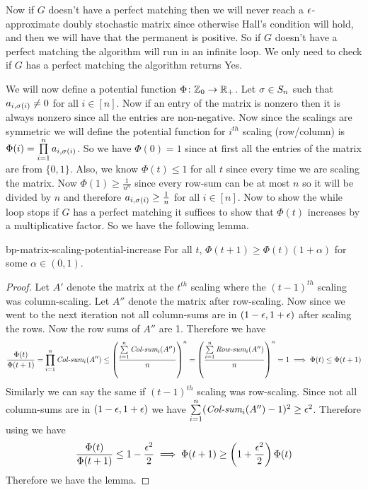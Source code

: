 Now if $G$ doesn't have a perfect matching then we will never reach a $\epsilon$-approximate doubly stochastic matrix since otherwise Hall's condition will hold, and then we will have that the permanent is positive. So if $G$ doesn't have a perfect matching the algorithm will run in an infinite loop. We only need to check if $G$ has a perfect matching the algorithm returns Yes.

We will now define a potential function $\Phi\colon \mathbb{Z}_0\to \mathbb{R}_+$. Let $\sigma\in S_n$ such that $a_{i,\sigma(i)}\neq 0$ for all $i\in[n]$. Now if an entry of the matrix is nonzero then it is always nonzero since all the entries are non-negative. Now since the scalings are symmetric we will define the potential function for $i^{th}$ scaling (row/column) is $\Phi(i)=\prod\limits_{i=1}^n a_{i,\sigma(i)}$. So we have $\Phi(0)=1$ since at first all the entries of the matrix are from $\{0,1\}$. Also, we know $\Phi(t)\leq 1$ for all $t$ since every time we are scaling the matrix. Now $\Phi(1)\geq \frac1{n^n}$ since every row-sum can be at most $n$ so it will be divided by $n$ and therefore $a_{i,\sigma(i)}\geq \frac1n$ for all $i\in[n]$. Now to show the while loop stops if $G$ has a perfect matching it suffices to show that $\Phi(t)$ increases by a multiplicative factor. So we have the following lemma.
\begin{lemma}{}{bp-matrix-scaling-potential-increase}
	For all $t$, 	$\Phi(t+1)\geq \Phi(t)(1+\alpha)$ for some $\alpha\in (0,1)$.
\end{lemma}
\begin{proof}
	Let $A'$ denote the matrix at the $t^{th}$ scaling where the $(t-1)^{th}$ scaling was column-scaling. Let $A''$ denote the matrix after row-scaling. Now since we went to the next iteration not all column-sums are in $(1-\epsilon, 1+\epsilon)$ after scaling the rows. Now the row sums of $A''$ are 1. Therefore we have $$\frac{\Phi(t)}{\Phi(t+1)}= \prod_{i=1}^n\emph{Col-sum}_i(A'')\leq \left(\frac{\sum\limits_{i=1}^n \emph{Col-sum}_i(A'')}n\right)^n=\left(\frac{\sum\limits_{i=1}^n \emph{Row-sum}_i(A'')}n\right)^n=1\implies \Phi(t)\leq \Phi(t+1)$$Similarly we can say the same if $(t-1)^{th}$ scaling was row-scaling. Since  not all column-sums are in $(1-\epsilon, 1+\epsilon)$ we have $\sum\limits_{i=1}^n(\emph{Col-sum}_i(A'')-1)^2\geq \epsilon^2$. Therefore using  we have $$\frac{\Phi(t)}{\Phi(t+1)}\leq 1-\frac{\epsilon^2}{2}\implies\Phi(t+1)\geq \left(1+\frac{\epsilon^2}2\right)\Phi(t)$$Therefore we have the lemma.
\end{proof}

